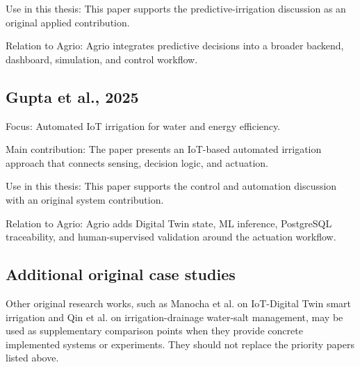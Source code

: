 Use in this thesis: This paper supports the predictive-irrigation discussion as an original applied contribution.

Relation to Agrio: Agrio integrates predictive decisions into a broader backend, dashboard, simulation, and control workflow.

\subsection{Gupta et al., 2025}

Focus: Automated IoT irrigation for water and energy efficiency.

Main contribution: The paper presents an IoT-based automated irrigation approach that connects sensing, decision logic, and actuation.

Use in this thesis: This paper supports the control and automation discussion with an original system contribution.

Relation to Agrio: Agrio adds Digital Twin state, ML inference, PostgreSQL traceability, and human-supervised validation around the actuation workflow.

\subsection{Additional original case studies}

Other original research works, such as Manocha et al. on IoT-Digital Twin smart irrigation and Qin et al. on irrigation-drainage water-salt management, may be used as supplementary comparison points when they provide concrete implemented systems or experiments. They should not replace the priority papers listed above.

